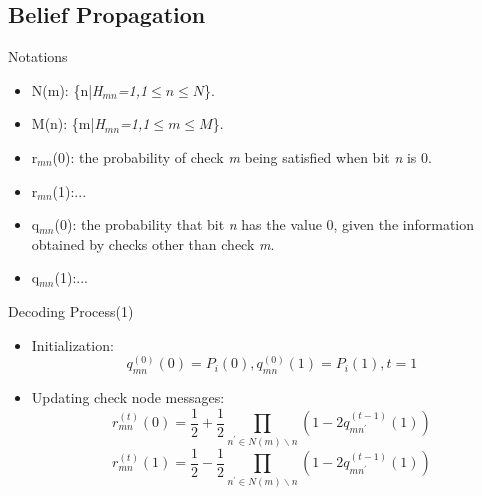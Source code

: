 \def\CTeXPreproc{Created by ctex v0.2.12, don't edit!}\documentclass{beamer}
\newcommand{\xieti}{\textsl}
\begin{document}
\subsection{Belief Propagation}
\begin{frame}
    \begin{block}{Notations}
        \begin{itemize}
        \item N(m): \{n|\xieti{H$_{mn}$=1,1$\leq n\leq N$}\}.
        \item M(n): \{m|\xieti{H$_{mn}$=1,1$\leq m\leq M$}\}.
        \item r$_{mn}$(0): the probability of check \xieti{m} being satisfied when bit \xieti{n} is 0.
        \item r$_{mn}$(1):\quad...
        \item q$_{mn}$(0): the probability that bit \xieti{n} has the value 0, given the information obtained by checks other than check \xieti{m}.
        \item q$_{mn}$(1):\quad...
        \end{itemize}
    \end{block}
\end{frame}
\begin{frame}
    \begin{block}{Decoding Process(1)}
        \begin{itemize}
        \item Initialization: \begin{equation*}q_{mn}^{(0)}(0)=P_i(0), q_{mn}^{(0)}(1)=P_i(1), t=1\end{equation*}
        \item Updating check node messages: \begin{equation*}
                                            r_{mn}^{(t)}(0)=\frac{1}{2}+\frac{1}{2}\prod_{n^\prime\in N(m)\backslash n}
                                            (1-2q_{mn^\prime}^{(t-1)}(1))
                                            \end{equation*}
                                            \begin{equation*}
                                            r_{mn}^{(t)}(1)=\frac{1}{2}-\frac{1}{2}\prod_{n^\prime\in N(m)\backslash n}
                                            (1-2q_{mn^\prime}^{(t-1)}(1))
                                            \end{equation*}
        \end{itemize}
    \end{block}
\end{frame}
\end{document}
